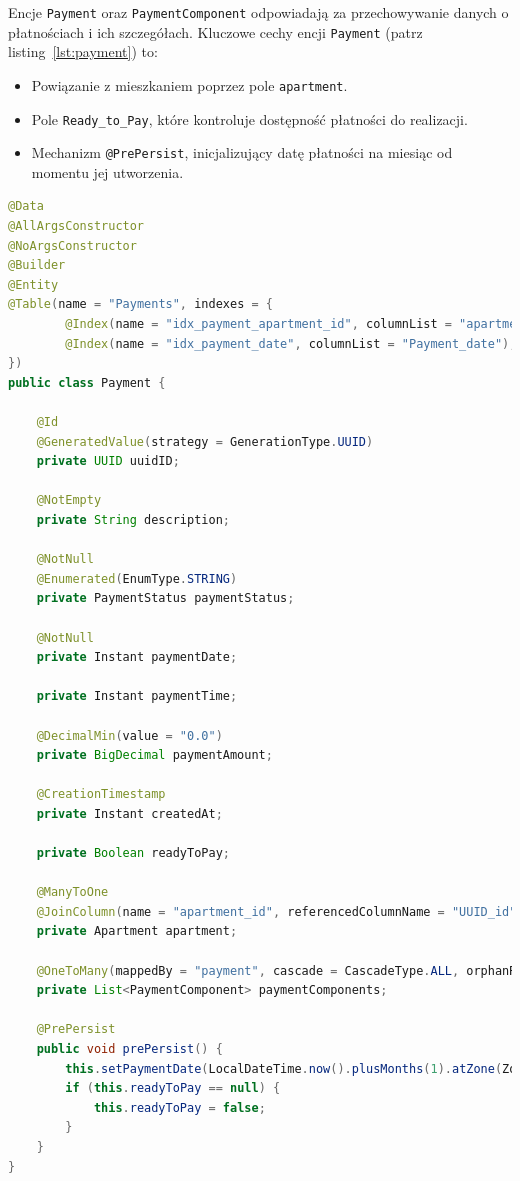Encje \texttt{Payment} oraz \texttt{PaymentComponent} odpowiadają za przechowywanie danych o płatnościach i ich szczegółach. Kluczowe cechy encji \texttt{Payment} (patrz listing~\ref{lst:payment}) to:
\begin{itemize}
    \item Powiązanie z mieszkaniem poprzez pole \texttt{apartment}.
    \item Pole \texttt{Ready\_to\_Pay}, które kontroluje dostępność płatności do realizacji.
    \item Mechanizm \texttt{@PrePersist}, inicjalizujący datę płatności na miesiąc od momentu jej utworzenia.
\end{itemize}
\begin{lstlisting}[language=Java, style=JavaStyle, caption=Kod encji \texttt{Payment},label=lst:payment]
@Data
@AllArgsConstructor
@NoArgsConstructor
@Builder
@Entity
@Table(name = "Payments", indexes = {
        @Index(name = "idx_payment_apartment_id", columnList = "apartment_id"),
        @Index(name = "idx_payment_date", columnList = "Payment_date"),
})
public class Payment {

    @Id
    @GeneratedValue(strategy = GenerationType.UUID)
    private UUID uuidID;

    @NotEmpty
    private String description;

    @NotNull
    @Enumerated(EnumType.STRING)
    private PaymentStatus paymentStatus;

    @NotNull
    private Instant paymentDate;

    private Instant paymentTime;

    @DecimalMin(value = "0.0")
    private BigDecimal paymentAmount;

    @CreationTimestamp
    private Instant createdAt;

    private Boolean readyToPay;

    @ManyToOne
    @JoinColumn(name = "apartment_id", referencedColumnName = "UUID_id")
    private Apartment apartment;

    @OneToMany(mappedBy = "payment", cascade = CascadeType.ALL, orphanRemoval = true)
    private List<PaymentComponent> paymentComponents;

    @PrePersist
    public void prePersist() {
        this.setPaymentDate(LocalDateTime.now().plusMonths(1).atZone(ZoneId.systemDefault()).toInstant());
        if (this.readyToPay == null) {
            this.readyToPay = false;
        }
    }
}
\end{lstlisting}

